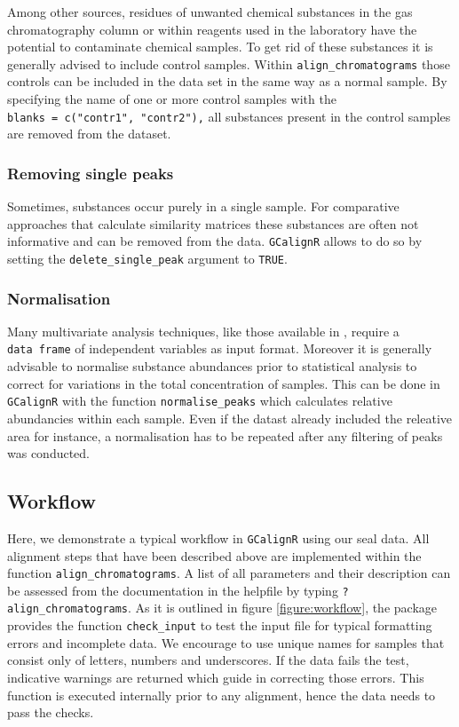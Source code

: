 Among other sources, residues of unwanted chemical substances in the gas
chromatography column or within reagents used in the laboratory have the
potential to contaminate chemical samples. To get rid of these
substances it is generally advised to include control samples. Within
\texttt{align\_chromatograms} those controls can be included in the data
set in the same way as a normal sample. By specifying the name of one or
more control samples with the
\texttt{blanks\ =\ c("contr1",\ "contr2"),} all substances present in
the control samples are removed from the dataset.

\subsubsection{Removing single peaks}\label{removing-single-peaks}

Sometimes, substances occur purely in a single sample. For comparative
approaches that calculate similarity matrices these substances are often
not informative and can be removed from the data. \texttt{GCalignR}
allows to do so by setting the \texttt{delete\_single\_peak} argument to
\texttt{TRUE}.

\subsubsection{Normalisation}\label{normalisation}

Many multivariate analysis techniques, like those available in
, require a \texttt{data\ frame} of independent variables as
input format. Moreover it is generally advisable to normalise substance
abundances prior to statistical analysis to correct for variations in
the total concentration of samples. This can be done in
\texttt{GCalignR} with the function \texttt{normalise\_peaks} which
calculates relative abundancies within each sample. Even if the datast
already included the releative area for instance, a normalisation has to
be repeated after any filtering of peaks was conducted.

\subsection{Workflow}\label{workflow}

Here, we demonstrate a typical workflow in \texttt{GCalignR} using our
seal data. All alignment steps that have been described above are
implemented within the function \texttt{align\_chromatograms}. A list of
all parameters and their description can be assessed from the
documentation in the helpfile by typing \texttt{?align\_chromatograms}.
As it is outlined in figure \ref{figure:workflow}, the package provides
the function \texttt{check\_input} to test the input file for typical
formatting errors and incomplete data. We encourage to use unique names
for samples that consist only of letters, numbers and underscores. If
the data fails the test, indicative warnings are returned which guide in
correcting those errors. This function is executed internally prior to
any alignment, hence the data needs to pass the checks.

